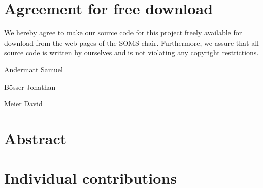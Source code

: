 \documentclass[11pt,twoside]{article}
\begin{document}

\newpage


\newpage
\section*{Agreement for free download}
\bigskip

\bigskip

\large We hereby agree to make our source code for this project freely available for download from the web pages of the SOMS chair. Furthermore, we assure that all source code is written by ourselves and is not violating any copyright restrictions.

\begin{center}
\bigskip\bigskip\bigskip\bigskip\bigskip\bigskip\bigskip\bigskip\bigskip


\large Andermatt Samuel
\bigskip\bigskip\bigskip\bigskip\bigskip\bigskip\bigskip\bigskip\bigskip

\large B\"osser Jonathan
\bigskip\bigskip\bigskip\bigskip\bigskip\bigskip\bigskip\bigskip\bigskip

\large Meier David

\end{center}
\newpage

%

\tableofcontents

\newpage

\renewcommand{\lstlistlistingname}{Matlabcode}
\lstlistoflistings


\listoffigures
 \listoftables
\newpage
{}
\section{Abstract}

\clearpage



\section{Individual contributions}
\end{document}
